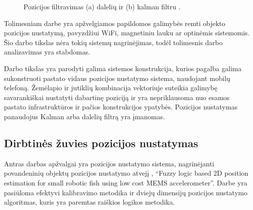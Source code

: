 \begin{figure}[H]
    \label{fig:pozition_estimation_with_parctile_filter}
    \centering
    \caption{Pozicijos filtravimas (a) dalelių ir (b) kalman filtru \cite{willemsenconcept}.}
\end{figure}


Tolimesniam darbe yra apžvelgiamos papildomos galimybės remti objekto pozicijos nustatymą, pavyzdžiui WiFi, magnetiniu lauku ar optinėmis sistemomis. Šio darbo tikslas nėra tokių sistemų nagrinėjimas, todėl tolimesnis darbo analizavimas yra stabdomas.

Darbo tikslas yra parodyti galima sistemos konstrukcija, kurios pagalba galima sukonstruoti pastato vidaus pozicijos nustatymo sistema, naudojant mobilų telefoną. Žemėlapio ir jutiklių kombinacija vektoriuje suteikia galimybę savarankiškai nustatyti dabartinę poziciją ir yra nepriklausoma nuo esamos pastato infrastruktūros ir pačios konstrukcijos ypatybės. Pozicijos nustatymas panaudojus Kalman arba dalelių filtrą yra įmanomas.  

\subsection{Dirbtinės žuvies pozicijos nustatymas}

Antras darbas apžvalgai yra pozicijos nustatymo sistema, nagrinėjanti povandeninių objektų pozicijos nustatymo atvejį \cite{yoo2011fuzzy}, ``Fuzzy logic based 2D position estimation for small robotic fish using low cost MEMS accelerometer''. Darbe yra pasiūloma efektyvi kalibravimo metodika ir dviejų dimensijų pozicijos nustatymo algoritmas, kuris yra paremtas raiškios logikos metodika. 

